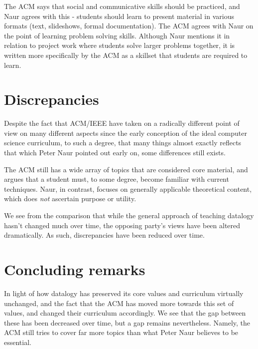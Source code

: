 \documentclass{article}
\begin{document}
The ACM says that social and communicative skills should be practiced, and Naur agrees with this - students should learn
to present material in various formats (text, slideshows, formal documentation).
The ACM agrees with Naur on the point of learning problem solving skills. Although Naur mentions it in relation to
project work where students solve larger problems together, it is written more specifically by the ACM as a skillset
that students are required to learn.

\section{Discrepancies}
Despite the fact that ACM/IEEE have taken on a radically different point of view on many different aspects since the
early conception of the ideal computer science curriculum, to such a degree, that many things almost exactly reflects
that which Peter Naur pointed out early on, some differences still exists.

The ACM still has a wide array of topics that are considered core material, and argues that a student must, to some
degree, become familiar with current techniques. Naur, in contrast, focuses on generally applicable theoretical content,
which does \emph{not} ascertain purpose or utility.

We see from the comparison that while the general approach of teaching datalogy hasn’t changed much over time, the
opposing party’s views have been altered dramatically. As such, discrepancies have been reduced over time.

\section{Concluding remarks}
In light of how datalogy has preserved its core values and curriculum virtually unchanged, and the fact that the ACM has
moved more towards this set of values, and changed their curriculum accordingly. We see that the gap between these has
been decreased over time, but a gap remains nevertheless. Namely, the ACM still tries to cover far more topics than what
Peter Naur believes to be essential.
\end{document}
